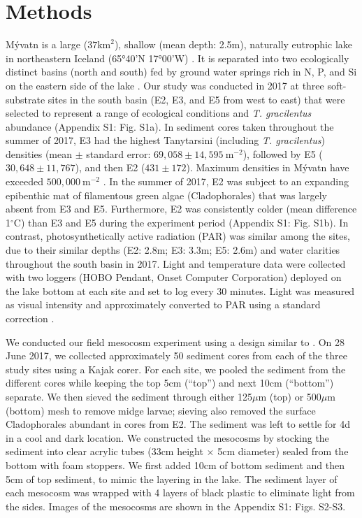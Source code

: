 \documentclass[12pt]{article}
\begin{document}
\section*{Methods}


M\'{y}vatn is a large ($37\text{km}^2$), shallow (mean depth: 2.5m), 
naturally eutrophic lake in northeastern Iceland (65°40’N 17°00’W) \citep{einarsson2004}.
It is separated into two ecologically distinct basins (north and south)
fed by ground water springs rich in N, P, and Si on the eastern side of the lake
\citep{einarsson2004}.
Our study was conducted in 2017 at three soft-substrate sites in the south basin  
(E2, E3, and E5 from west to east) 
that were selected to represent a range of ecological conditions 
and \textit{T. gracilentus} abundance (Appendix S1: Fig. S1a).
In sediment cores taken throughout the summer of 2017, E3 
had the highest Tanytarsini (including \textit{T. gracilentus}) densities 
(mean $\pm$ standard error: $69,058 \pm 14,595~\text{m}^{-2}$),
followed by E5 ($30,648 \pm 11,767$), and then E2 ($431 \pm 172$).
Maximum densities in M\'{y}vatn have exceeded $500,000~\text{m}^{-2}$ 
\citep{thorbergsdottir2004}.
In the summer of 2017, 
E2 was subject to an expanding epibenthic mat 
of filamentous green algae (Cladophorales) that was largely absent from E3 and E5.
Furthermore, E2 was consistently colder (mean difference 1$^{\circ}$C) 
than E3 and E5 during the experiment period (Appendix S1: Fig. S1b).
In contrast, photosynthetically active radiation (PAR) was similar among the sites,
due to their similar depths (E2: 2.8m; E3: 3.3m; E5: 2.6m)
and water clarities throughout the south basin in 2017.
Light and temperature data were collected with two loggers 
(HOBO Pendant, Onset Computer Corporation) deployed on the lake bottom at each site
and set to log every 30 minutes.
Light was measured as visual intensity
and approximately converted to PAR using a standard correction \citep{thimijan1983}.

We conducted our field mesocosm experiment using a design
similar to \cite{phillips2019}.
On 28 June 2017, we collected approximately 50 sediment cores from each 
of the three study sites using a Kajak corer. 
For each site, we pooled the sediment from the different cores while keeping the 
top 5cm (``top'') and next 10cm (``bottom'') separate.
We then sieved the sediment through either 125$\mu \text{m}$ (top) 
or 500$\mu \text{m}$ (bottom) mesh
to remove midge larvae; 
sieving also removed the surface Cladophorales abundant in cores from E2.
The sediment was left to settle for 4d in a cool and dark location.
We constructed the mesocosms by stocking the sediment into 
clear acrylic tubes (33cm height $\times$ 5cm diameter) 
sealed from the bottom with foam stoppers.
We first added 10cm of bottom sediment and then 5cm of top sediment, 
to mimic the layering in the lake.
The sediment layer of each mesocosm was wrapped with 4 layers of black plastic
to eliminate light from the sides.
Images of the mesocosms are shown in the Appendix S1: Figs. S2-S3.
\end{document}
